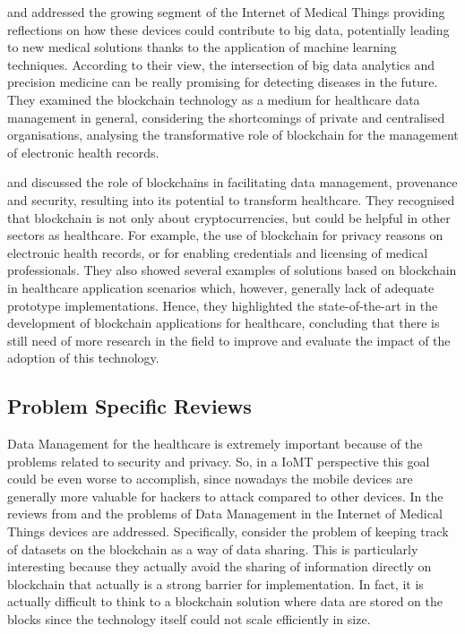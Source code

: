 \documentclass[preprint]{elsarticle}
\begin{document}
\citet{pilkington2017can} and \citet{borovska2018big} addressed the growing segment of the Internet of Medical Things providing reflections on how these devices could contribute to big data, potentially leading to new medical solutions thanks to the application of machine learning techniques. According to their view, the intersection of big data analytics and precision medicine can be really promising for detecting diseases in the future.  They examined the blockchain technology as a medium for healthcare data management in general, considering the shortcomings of private and centralised organisations, analysing the transformative role of blockchain for the management of electronic health records.

\citet{mackey2019fit} and \citet{agbo2019blockchain} discussed the role of blockchains in facilitating data management, provenance and security, resulting into its potential to transform healthcare. They recognised that blockchain is not only about cryptocurrencies, but could be helpful in other sectors as healthcare. For example, the use of blockchain for privacy reasons on electronic health records, or for enabling credentials and licensing of medical professionals.%
They also showed several examples of solutions based on blockchain in healthcare application scenarios which, however, generally lack of adequate prototype implementations. Hence, they highlighted the state-of-the-art in the development of blockchain applications for healthcare, concluding that there is still need of more research in the field to improve and evaluate the impact of the adoption of this technology.

\subsection{Problem Specific Reviews}
Data Management for the healthcare is extremely important because of the problems related to security and privacy. So, in a IoMT perspective this goal could be even worse to accomplish, since nowadays the mobile devices are generally more valuable for hackers to attack compared to other devices. 
In the reviews from \citet{khezr2019blockchain} and \citet{banerjee2018blockchain} the problems of Data Management in the Internet of Medical Things devices are addressed. Specifically, \citet{banerjee2018blockchain} consider the problem of keeping track of datasets on the blockchain as a way of data sharing. This is particularly interesting because they actually avoid the sharing of information directly on blockchain that actually is a strong barrier for implementation. In fact, it is actually difficult to think to a blockchain solution where data are stored on the blocks since the technology itself could not scale efficiently in size.
\end{document}
